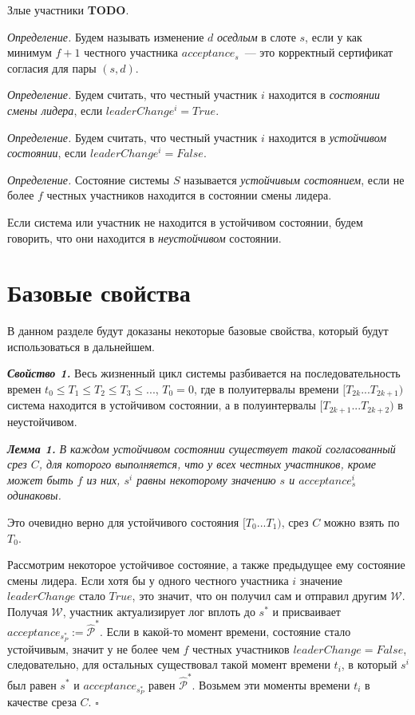 Злые участники \textbf{TODO}.

\textit{Определение.} Будем называть изменение $d$ \textit{оседлым} в слоте $s$, если у как минимум $f+1$ честного участника $acceptance_s$~--- это корректный сертификат согласия для пары $(s, d)$.

\textit{Определение.} Будем считать, что честный участник $i$ находится в \textit{состоянии смены лидера}, если $leaderChange^i = True$.

\textit{Определение.} Будем считать, что честный участник $i$ находится в \textit{устойчивом состоянии}, если $leaderChange^i = False$.

\textit{Определение.} Состояние системы $S$ называется \textit{устойчивым состоянием}, если не более $f$ честных участников находится в состоянии смены лидера.

Если система или участник не находится в устойчивом состоянии, будем говорить, что они находится в \textit{неустойчивом} состоянии.

\section{Базовые свойства}
В данном разделе будут доказаны некоторые базовые свойства, который будут использоваться в дальнейшем.

\textbf{\textit{Свойство 1.}} Весь жизненный цикл системы разбивается на последовательность времен
$t_0 \le T_1 \le T_2 \le T_3 \le ...$, $T_0=0$, где в полуитервалы времени $[T_{2k}...T_{2k+1})$ система находится в устойчивом состоянии, а в полуинтервалы $[T_{2k+1}...T_{2k+2})$ в неустойчивом.

\textbf{\textit{Лемма 1.}} \textit{В каждом устойчивом состоянии существует такой согласованный срез $C$, для которого выполняется, что у всех честных участников, кроме может быть $f$ из них, $s^i$ равны некоторому значению $s$ и $acceptance^i_s$ одинаковы.}

Это очевидно верно для устойчивого состояния $[T_0...T_1)$, срез $C$ можно взять по $T_0$.

Рассмотрим некоторое устойчивое состояние, а также предыдущее ему состояние смены лидера.
Если хотя бы у одного честного участника $i$ значение $leaderChange$ стало $True$, это значит, что он получил сам и отправил другим $\mathcal{W}$. Получая $\mathcal{W}$, участник актуализирует лог вплоть до $s^{*}$ и присваивает $acceptance_{s_P^{*}} := \hat{\mathcal{P}}^{*}$. Если в какой-то момент времени, состояние стало устойчивым, значит у не более чем $f$ честных участников $leaderChange = False$, следовательно, для остальных существовал такой момент времени $t_i$, в который $s^i$ был равен $s^{*}$ и $acceptance_{s_P^{*}}$ равен $\hat{\mathcal{P}}^{*}$. Возьмем эти моменты времени $t_i$ в качестве среза $C$. $\square$

